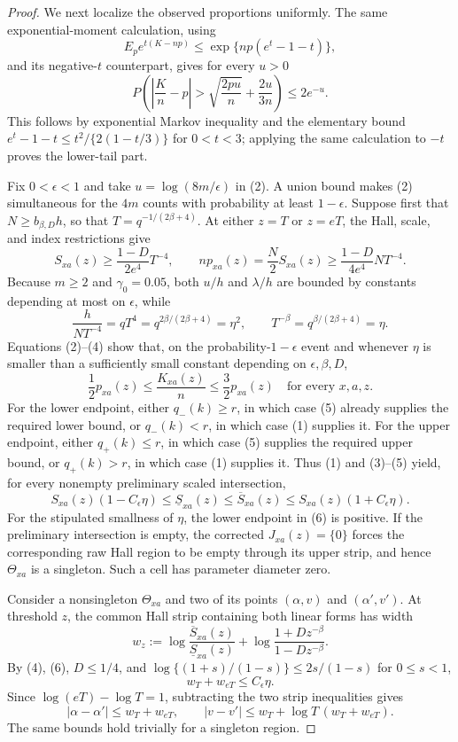 \documentclass{article}
\begin{document}
\begin{proof}
We next localize the observed proportions uniformly.  The same exponential-moment calculation, using
\[
 E_p e^{t(K-np)}
 \leq\exp\{np(e^t-1-t)\},
\]
and its negative-\(t\) counterpart, gives for every \(u>0\)
\[
 P\!\left(\left|\frac Kn-p\right|>
       \sqrt{\frac{2pu}{n}}+\frac{2u}{3n}\right)
 \leq2e^{-u}.
 \tag{2}
\]
This follows by exponential Markov inequality and the elementary bound
\(e^t-1-t\leq t^2/\{2(1-t/3)\}\) for \(0<t<3\); applying the same calculation to \(-t\) proves the lower-tail part.

Fix \(0<\epsilon<1\) and take \(u=\log(8m/\epsilon)\) in (2).  A union bound makes (2) simultaneous for the \(4m\) counts with probability at least \(1-\epsilon\).  Suppose first that \(N\geq b_{\beta,D}h\), so that \(T=q^{-1/(2\beta+4)}\).  At either \(z=T\) or \(z=eT\), the Hall, scale, and index restrictions give
\[
 S_{xa}(z)\geq\frac{1-D}{2e^4}T^{-4},
 \qquad np_{xa}(z)=\frac N2S_{xa}(z)
 \geq\frac{1-D}{4e^4}NT^{-4}.
 \tag{3}
\]
Because \(m\geq2\) and \(\gamma_0=0.05\), both \(u/h\) and \(\lambda/h\) are bounded by constants depending at most on \(\epsilon\), while
\[
 \frac{h}{NT^{-4}}=qT^4
 =q^{2\beta/(2\beta+4)}=\eta^2,
 \qquad T^{-\beta}=q^{\beta/(2\beta+4)}=\eta.
 \tag{4}
\]
Equations (2)--(4) show that, on the probability-\(1-\epsilon\) event and whenever \(\eta\) is smaller than a sufficiently small constant depending on \(\epsilon,\beta,D\),
\[
 \frac12p_{xa}(z)\leq\frac{K_{xa}(z)}n\leq\frac32p_{xa}(z)
 \quad\text{for every }x,a,z.
 \tag{5}
\]
For the lower endpoint, either \(q_-(k)\geq r\), in which case (5) already supplies the required lower bound, or \(q_-(k)<r\), in which case (1) supplies it.  For the upper endpoint, either \(q_+(k)\leq r\), in which case (5) supplies the required upper bound, or \(q_+(k)>r\), in which case (1) supplies it.  Thus (1) and (3)--(5) yield, for every nonempty preliminary scaled intersection,
\[
 S_{xa}(z)(1-C_\epsilon\eta)
 \leq\underline S_{xa}(z)
 \leq\overline S_{xa}(z)
 \leq S_{xa}(z)(1+C_\epsilon\eta).
 \tag{6}
\]
For the stipulated smallness of \(\eta\), the lower endpoint in (6) is positive.  If the preliminary intersection is empty, the corrected \(J_{xa}(z)=\{0\}\) forces the corresponding raw Hall region to be empty through its upper strip, and hence \(\Theta_{xa}\) is a singleton.  Such a cell has parameter diameter zero.

Consider a nonsingleton \(\Theta_{xa}\) and two of its points \((\alpha,v)\) and \((\alpha',v')\).  At threshold \(z\), the common Hall strip containing both linear forms has width
\[
 w_z:=\log\frac{\overline S_{xa}(z)}{\underline S_{xa}(z)}
      +\log\frac{1+Dz^{-\beta}}{1-Dz^{-\beta}}.
\]
By (4), (6), \(D\leq1/4\), and
\(\log\{(1+s)/(1-s)\}\leq2s/(1-s)\) for \(0\leq s<1\),
\[
 w_T+w_{eT}\leq C_\epsilon\eta.
 \tag{7}
\]
Since \(\log(eT)-\log T=1\), subtracting the two strip inequalities gives
\[
 |\alpha-\alpha'|\leq w_T+w_{eT},
 \qquad
 |v-v'|\leq w_T+\log T\,(w_T+w_{eT}).
 \tag{8}
\]
The same bounds hold trivially for a singleton region.


\end{proof}
\end{document}
